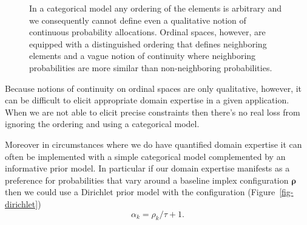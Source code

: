 \documentclass[
  letterpaper,
  DIV=11,
  numbers=noendperiod]{scrartcl}
\begin{document}
\begin{figure}


\caption{\label{fig-continuity}In a categorical model any ordering of
the elements is arbitrary and we consequently cannot define even a
qualitative notion of continuous probability allocations. Ordinal
spaces, however, are equipped with a distinguished ordering that defines
neighboring elements and a vague notion of continuity where neighboring
probabilities are more similar than non-neighboring probabilities.}

\end{figure}%

Because notions of continuity on ordinal spaces are only qualitative,
however, it can be difficult to elicit appropriate domain expertise in a
given application. When we are not able to elicit precise constraints
then there's no real loss from ignoring the ordering and using a
categorical model.

Moreover in circumstances where we do have quantified domain expertise
it can often be implemented with a simple categorical model complemented
by an informative prior model. In particular if our domain expertise
manifests as a preference for probabilities that vary around a baseline
implex configuration \(\boldsymbol{\rho}\) then we could use a Dirichlet
prior model with the configuration (Figure~\ref{fig-dirichlet}) \[
\alpha_{k} = \rho_{k} / \tau + 1.
\]
\end{document}
